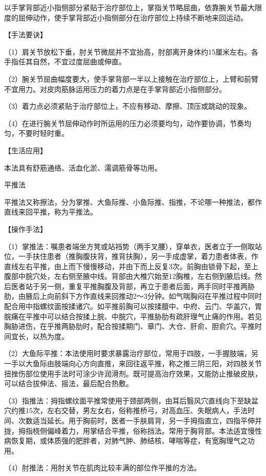 \documentclass[12pt,UTF8]{ctexbook}
\begin{document}
以手掌背部近小指侧部分紧贴于治疗部位上，掌指关节略屈曲，依靠腕关节最大限度的屈伸动作，使手掌背部近小指侧部分在治疗部位上持续不断地来回运动。

【手法要诀】

（1）肩关节放松下垂，肘关节微屈并不宜抬高，肘部离开身体约15厘米左右。各手指任其自然，不宜过度屈曲或伸直。

（2）腕关节屈曲幅度要大，使手掌背部一半以上接触在治疗部位上，上臂和前臂不宜用力。对皮肉筋脉运用压力的着力点是在手掌背部近小指侧部分。

（3）着力点必须紧贴于治疗部位上，不应有移动、摩擦、顶压或跳动的现象。

（4）在进行腕关节屈伸动作时所运用的压力必须要均匀，动作要协调，节奏均匀，不要时轻时重。

【生活应用】

本法具有舒筋通络、活血化淤、濡调筋骨等功用。

平推法

平推法又称擦法，分为掌推、大鱼际推、小鱼际推、指推，不论哪一种推法，都作直线来回平推，称为平推法。

【操作手法】

（1）掌推法：嘱患者端坐方凳或站裆势（两手叉腰），穿单衣，医者立于一侧取站位，一手扶住患者（推胸腹扶背，推背扶胸），另一手成虚掌，着力患者体表，作直线左右平推，由上而下慢慢移动，并由下而上反复3次。前胸由锁骨下起，至上腹部中脘穴处，左右侧至腋中线。背部由大椎穴始至12胸椎，左右侧到腋后线。然后医者站于另一侧，重复平推胸腹及背部，再立于患者后面，两手同时平推两胁肋，由腋后上向前斜下方作直线来回推动2～3分钟。如气喘胸闷在平推过程中同时配合用中指螺纹面按揉诸穴。如平推前胸可以按揉膻中、中府、云门、华盖穴，胃脘痛在平推中可以结合按揉上脘、中脘穴，平推胁肋有疏肝理气止痛的作用。若见胸胁进伤，在乎推两胁肋时，配合按揉期门、章门、大仓、肝俞、胆俞穴。平推时间宜长，以热为度。

（2）大鱼际平推：本法使用时要求暴露治疗部位，常用于四肢，一手握肢端，另一手以大鱼际由肢端向心方向直推，来回往返平推，称之推三阴三阳，对四肢关节扭挫伤部位使用手法时可涂少许润滑剂。既可提高治疗效果，又能防止推破皮肤，可以结合拔伸法、摇法，最后配合热敷。

（3）指推法：拇指螺纹面平推常使用于颈部两侧，由耳后翳风穴直线向下至缺盆穴约推15次，左右交替，男左女右，俗称推桥弓，对高血压、失眠病人，手法时间、次数适当延长。用于胸前时，医者一手肤肩背，另一手拇指直立，四指平伸并拢，拇指桡侧偏峰着力，用掌结合平推，俗称挡法。常用于胸背部。本法适宜慢性病恢复期，或体质强的肥胖者，对肺气肿、肺结核、哮喘等症，有宽胸理气之功用。

（4）肘推法：用肘关节在肌肉比较丰满的部位作平推的方法。
\end{document}
